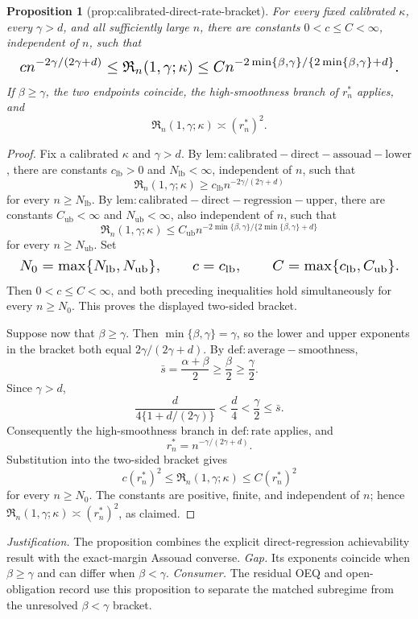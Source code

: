 \documentclass{article}
\newtheorem{proposition}{Proposition}
\begin{document}
\begin{proposition}[prop:calibrated-direct-rate-bracket]\label{prop:calibrated-direct-rate-bracket}
For every fixed calibrated \(\kappa\), every \(\gamma>d\), and all sufficiently large \(n\), there are constants \(0<c\le C<\infty\), independent of \(n\), such that
\[
\makebox[\linewidth][c]{\resizebox{0.98\linewidth}{!}{\(\displaystyle c n^{-2\gamma/(2\gamma+d)}
 \le \mathfrak R_n(1,\gamma;\kappa)
 \le C n^{-2\min\{\beta,\gamma\}/\{2\min\{\beta,\gamma\}+d\}}.\)}}
\]
If \(\beta\ge\gamma\), the two endpoints coincide, the high-smoothness branch of \(r_n^*\) applies, and
\[
 \mathfrak R_n(1,\gamma;\kappa)\asymp(r_n^*)^2.
\]
\end{proposition}
\begin{proof}
Fix a calibrated \(\kappa\) and \(\gamma>d\). By \(\mathrm{lem:calibrated-direct-assouad-lower}\), there are constants \(c_{\mathrm{lb}}>0\) and \(N_{\mathrm{lb}}<\infty\), independent of \(n\), such that
\[
\mathfrak R_n(1,\gamma;\kappa)\ge c_{\mathrm{lb}}n^{-2\gamma/(2\gamma+d)}
\]
for every \(n\ge N_{\mathrm{lb}}\). By \(\mathrm{lem:calibrated-direct-regression-upper}\), there are constants \(C_{\mathrm{ub}}<\infty\) and \(N_{\mathrm{ub}}<\infty\), also independent of \(n\), such that
\[
\mathfrak R_n(1,\gamma;\kappa)
\le C_{\mathrm{ub}}n^{-2\min\{\beta,\gamma\}/\{2\min\{\beta,\gamma\}+d\}}
\]
for every \(n\ge N_{\mathrm{ub}}\). Set
\[
\makebox[\linewidth][c]{\resizebox{0.98\linewidth}{!}{\(\displaystyle N_0=\max\{N_{\mathrm{lb}},N_{\mathrm{ub}}\},\qquad
c=c_{\mathrm{lb}},\qquad
C=\max\{c_{\mathrm{lb}},C_{\mathrm{ub}}\}.\)}}
\]
Then \(0<c\le C<\infty\), and both preceding inequalities hold simultaneously for every \(n\ge N_0\). This proves the displayed two-sided bracket.

Suppose now that \(\beta\ge\gamma\). Then \(\min\{\beta,\gamma\}=\gamma\), so the lower and upper exponents in the bracket both equal \(2\gamma/(2\gamma+d)\). By \(\mathrm{def:average-smoothness}\),
\[
\bar s=\frac{\alpha+\beta}{2}\ge\frac{\beta}{2}\ge\frac{\gamma}{2}.
\]
Since \(\gamma>d\),
\[
\frac{d}{4\{1+d/(2\gamma)\}}
<\frac d4
<\frac\gamma2
\le\bar s.
\]
Consequently the high-smoothness branch in \(\mathrm{def:rate}\) applies, and
\[
r_n^*=n^{-\gamma/(2\gamma+d)}.
\]
Substitution into the two-sided bracket gives
\[
c(r_n^*)^2
\le\mathfrak R_n(1,\gamma;\kappa)
\le C(r_n^*)^2
\]
for every \(n\ge N_0\). The constants are positive, finite, and independent of \(n\); hence \(\mathfrak R_n(1,\gamma;\kappa)\asymp(r_n^*)^2\), as claimed.
\end{proof}
\par\smallskip\noindent \textit{Justification.} The proposition combines the explicit direct-regression achievability result with the exact-margin Assouad converse. \textit{Gap.} Its exponents coincide when \(\beta\ge\gamma\) and can differ when \(\beta<\gamma\). \textit{Consumer.} The residual OEQ and open-obligation record use this proposition to separate the matched subregime from the unresolved \(\beta<\gamma\) bracket.
\end{document}
